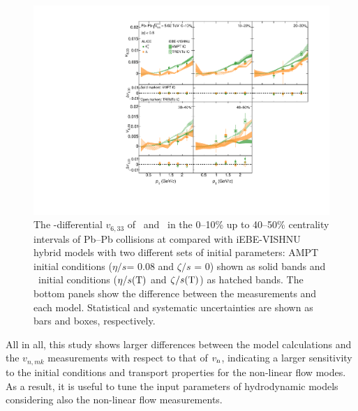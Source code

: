  \begin{figure}[h]
\begin{center}
\includegraphics[scale=0.73]{figures/model/TrentoAndAMPT_v633_gap00_LambdaK0s.pdf}
\end{center}
\caption{The \pT-differential $v_{6,33}$ of \Ks~and \lambdas~in the 0--10\% up to 40--50\% centrality intervals of Pb--Pb collisions at \sNN compared with iEBE-VISHNU hybrid models with two different sets of initial parameters: AMPT initial conditions ($\eta/s$= 0.08 and $\zeta/s$ = 0) shown as solid bands and \trento~initial conditions ($\eta/s({\rm T})$ and $\zeta/s({\rm T})$) as hatched bands. The bottom panels show the difference between the measurements and each model. Statistical and systematic uncertainties are shown as bars and boxes, respectively.}
\label{v633_model_KL}
\end{figure}


All in all, this study shows larger differences between the model calculations and the $v_{n,mk}$ measurements with respect to that of $v_{\rm n}$, indicating a larger sensitivity to the initial conditions and transport properties for the non-linear flow modes. As a result, it is useful to tune the input parameters of hydrodynamic models considering also the non-linear flow measurements. %

\newpage
